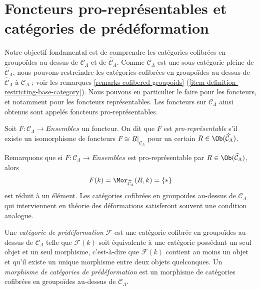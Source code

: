 \section{Foncteurs pro-représentables et catégories de prédéformation}
\label{section-cofibered-groupoids}

\noindent
Notre objectif fondamental est de comprendre les catégories cofibrées en
groupoïdes au-dessus de $\mathcal{C}_\Lambda$ et de
$\widehat{\mathcal{C}}_\Lambda$. Comme $\mathcal{C}_\Lambda$ est une
sous-catégorie pleine de $\widehat{\mathcal{C}}_\Lambda$, nous pouvons
restreindre les catégories cofibrées en groupoïdes au-dessus de
$\widehat{\mathcal{C}}_\Lambda$ à $\mathcal{C}_\Lambda$ ; voir les remarques
\ref{remarks-cofibered-groupoids}
(\ref{item-definition-restricting-base-category}).
Nous pouvons en particulier le faire pour les foncteurs, et notamment pour
les foncteurs représentables. Les foncteurs sur $\mathcal{C}_\Lambda$
ainsi obtenus sont appelés foncteurs pro-représentables.

\begin{definition}
\label{definition-prorepresentable}
Soit $F : \mathcal{C}_\Lambda \to \textit{Ensembles}$ un foncteur.
On dit que $F$ est {\it pro-représentable} s'il existe un isomorphisme
de foncteurs $F \cong \underline{R}|_{\mathcal{C}_\Lambda}$ pour un certain
$R \in \Ob(\widehat{\mathcal{C}}_\Lambda)$.
\end{definition}

\noindent
Remarquons que si $F : \mathcal{C}_\Lambda \to \textit{Ensembles}$ est
pro-représentable par $R \in \Ob(\widehat{\mathcal{C}}_\Lambda)$, alors
$$
F(k) = \Mor_{\widehat{\mathcal{C}}_\Lambda}(R, k) = \{*\}
$$
est réduit à un élément. Les catégories cofibrées en groupoïdes au-dessus de
$\mathcal{C}_\Lambda$ qui interviennent en théorie des déformations
satisferont souvent une condition analogue.

\begin{definition}
\label{definition-predeformation-category}
Une {\it catégorie de prédéformation} $\mathcal{F}$ est une catégorie
cofibrée en groupoïdes au-dessus de $\mathcal{C}_\Lambda$ telle que
$\mathcal{F}(k)$ soit équivalente à une catégorie possédant un seul objet et
un seul morphisme, c'est-à-dire que $\mathcal{F}(k)$ contient au moins un
objet et qu'il existe un unique morphisme entre deux objets quelconques. Un
{\it morphisme de catégories de prédéformation} est un morphisme de catégories
cofibrées en groupoïdes au-dessus de
$\mathcal{C}_\Lambda$.
\end{definition}

